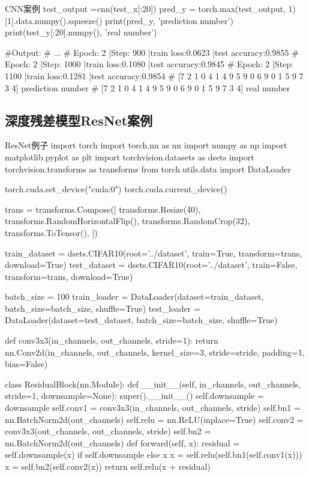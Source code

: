 \documentclass[openbib]{article}
\begin{document}
\begin{Python}{CNN案例}
	test_output =cnn(test_x[:20])
	pred_y = torch.max(test_output, 1)[1].data.numpy().squeeze()
	print(pred_y, 'prediction number')
	print(test_y[:20].numpy(), 'real number')
	
	#Output:
	#       ...
	#		Epoch: 2 |Step: 900 |train loss:0.0623 |test accuracy:0.9855
	#		Epoch: 2 |Step: 1000 |train loss:0.1080 |test accuracy:0.9845
	#		Epoch: 2 |Step: 1100 |train loss:0.1281 |test accuracy:0.9854
	#		[7 2 1 0 4 1 4 9 5 9 0 6 9 0 1 5 9 7 3 4] prediction number
	#		[7 2 1 0 4 1 4 9 5 9 0 6 9 0 1 5 9 7 3 4] real number
	
\end{Python}
\subsection{深度残差模型ResNet案例}
\begin{Python}{ResNet例子}
	import torch
	import torch.nn as nn
	import numpy as np
	import matplotlib.pyplot as plt
	import torchvision.datasets as dsets
	import torchvision.transforms as transforms
	from torch.utils.data import DataLoader
	
	torch.cuda.set_device("cuda:0")
	torch.cuda.current_device()
	
	trans = transforms.Compose([
	transforms.Resize(40),
	transforms.RandomHorizontalFlip(),
	transforms.RandomCrop(32),
	transforms.ToTensor(),
	])
	
	
	train_dataset = dsets.CIFAR10(root='../dataset', train=True, transform=trans, download=True)
	test_dataset = dsets.CIFAR10(root='../dataset', train=False, transform=trans, download=True)
	
	batch_size = 100
	train_loader = DataLoader(dataset=train_dataset, batch_size=batch_size, shuffle=True)
	test_loader = DataLoader(dataset=test_dataset, batch_size=batch_size, shuffle=True)
	
	def conv3x3(in_channels, out_channels, stride=1):
	return nn.Conv2d(in_channels, out_channels, kernel_size=3, stride=stride, padding=1, bias=False)
	
	
	class ResidualBlock(nn.Module):
	def __init__(self, in_channels, out_channels, stride=1, downsample=None):
	super().__init__()
	self.downsample = downsample
	self.conv1 = conv3x3(in_channels, out_channels, stride)
	self.bn1 = nn.BatchNorm2d(out_channels)
	self.relu = nn.ReLU(inplace=True)
	self.conv2 = conv3x3(out_channels, out_channels, stride)
	self.bn2 = nn.BatchNorm2d(out_channels)
	def forward(self, x):
	residual = self.downsample(x) if self.downsample else x
	x = self.relu(self.bn1(self.conv1(x)))
	x = self.bn2(self.conv2(x))
	return self.relu(x + residual)
	

\end{Python}
\end{document}
